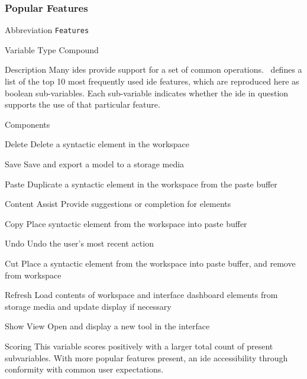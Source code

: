 \subsubsection{Popular Features}
\label{subsubsec:features}

\begin{AlignedDesc}
  \item[Abbreviation] \texttt{Features}

  \item[Variable Type] Compound

  \item[Description] Many \acp{ide} provide support for a set of common
  operations.~\cite{murphy2006} defines a list of the top 10 most
  frequently used \ac{ide} features, which are reproduced here as boolean
  sub-variables. Each sub-variable indicates whether the \ac{ide} in
  question supports the use of that particular feature.

  \item[Components]

  \begin{AlignedDesc}
    \item[Delete] Delete a syntactic element in the workspace
    \item[Save] Save and export a model to a storage media
    \item[Paste] Duplicate a syntactic element in the workspace from the
    paste buffer
    \item[Content Assist] Provide suggestions or completion for elements
    \item[Copy] Place syntactic element from the workspace into paste
    buffer
    \item[Undo] Undo the user's most recent action
    \item[Cut] Place a syntactic element from the workspace into paste
    buffer, and remove from workspace
    \item[Refresh] Load contents of workspace and interface dashboard
    elements from storage media and update display if necessary
    \item[Show View] Open and display a new tool in the interface
  \end{AlignedDesc}

  \item[Scoring] This variable scores positively with a larger total count
  of present subvariables. With more popular features present, an \ac{ide}
  accessibility through conformity with common user expectations.

\end{AlignedDesc}

